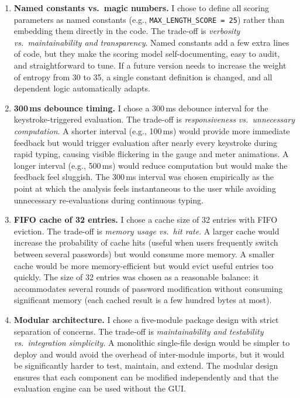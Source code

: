 \begin{enumerate}
    \item \textbf{Named constants vs.\ magic numbers.} I chose to define all scoring parameters as named constants (e.g., \texttt{MAX\_LENGTH\_SCORE = 25}) rather than embedding them directly in the code. The trade-off is \textit{verbosity vs.\ maintainability and transparency}. Named constants add a few extra lines of code, but they make the scoring model self-documenting, easy to audit, and straightforward to tune. If a future version needs to increase the weight of entropy from 30 to 35, a single constant definition is changed, and all dependent logic automatically adapts.

    \item \textbf{300\,ms debounce timing.} I chose a 300\,ms debounce interval for the keystroke-triggered evaluation. The trade-off is \textit{responsiveness vs.\ unnecessary computation}. A shorter interval (e.g., 100\,ms) would provide more immediate feedback but would trigger evaluation after nearly every keystroke during rapid typing, causing visible flickering in the gauge and meter animations. A longer interval (e.g., 500\,ms) would reduce computation but would make the feedback feel sluggish. The 300\,ms interval was chosen empirically as the point at which the analysis feels instantaneous to the user while avoiding unnecessary re-evaluations during continuous typing.

    \item \textbf{FIFO cache of 32 entries.} I chose a cache size of 32 entries with FIFO eviction. The trade-off is \textit{memory usage vs.\ hit rate}. A larger cache would increase the probability of cache hits (useful when users frequently switch between several passwords) but would consume more memory. A smaller cache would be more memory-efficient but would evict useful entries too quickly. The size of 32 entries was chosen as a reasonable balance: it accommodates several rounds of password modification without consuming significant memory (each cached result is a few hundred bytes at most).

    \item \textbf{Modular architecture.} I chose a five-module package design with strict separation of concerns. The trade-off is \textit{maintainability and testability vs.\ integration simplicity}. A monolithic single-file design would be simpler to deploy and would avoid the overhead of inter-module imports, but it would be significantly harder to test, maintain, and extend. The modular design ensures that each component can be modified independently and that the evaluation engine can be used without the GUI.
\end{enumerate}

